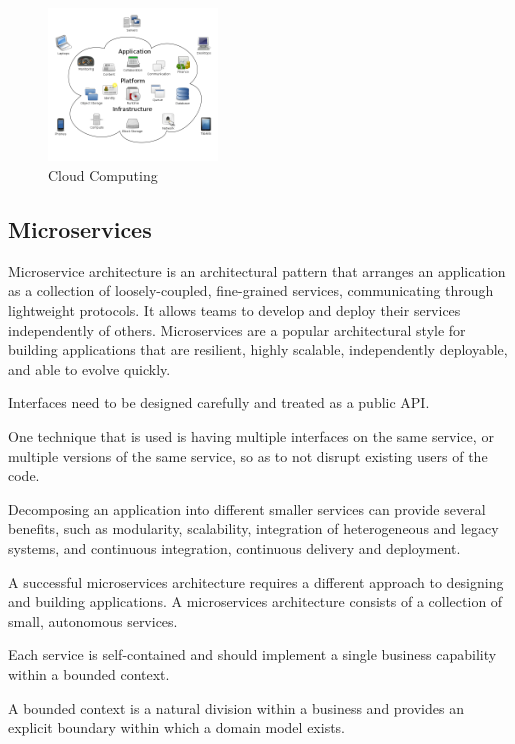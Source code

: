 \documentclass[conference]{IEEEtran}
\begin{document}
\begin{figure}[!h]
    \begin{center}
        \includegraphics[width=0.4\textwidth]{figures/Cloud-computing.svg.png}
    \end{center}
    \caption{Cloud Computing}
    \label{fig:cloud}
\end{figure}


\subsection{Microservices}

Microservice architecture is an architectural pattern that arranges an application as a collection of loosely-coupled, fine-grained services, communicating through lightweight protocols. It allows teams to develop and deploy their services independently of others. Microservices are a popular architectural style for building applications that are resilient, highly scalable, independently deployable, and able to evolve quickly.

Interfaces need to be designed carefully and treated as a public API.

One technique that is used is having multiple interfaces on the same service, or multiple versions of the same service, so as to not disrupt existing users of the code. \cite{b3}

Decomposing an application into different smaller services can provide several benefits, such as modularity, scalability, integration of heterogeneous and legacy systems, and continuous integration, continuous delivery and deployment.

A successful microservices architecture requires a different approach to designing and building applications.
A microservices architecture consists of a collection of small, autonomous services.

Each service is self-contained and should implement a single business capability within a bounded context.

A bounded context is a natural division within a business and provides an explicit boundary within which a domain model exists.
\end{document}
